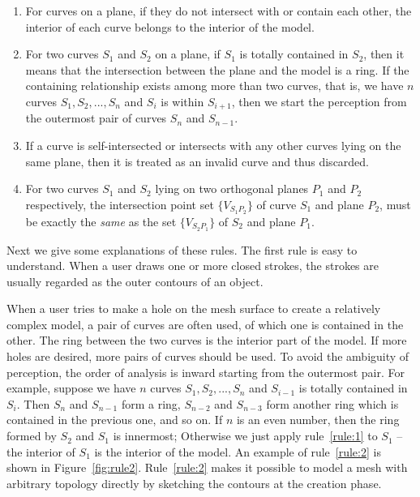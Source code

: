 \begin{enumerate}
    \item For curves on a plane, if they do not intersect with or contain each other, the interior of each curve belongs to the interior of the model.
    \label{rule:1}
    \item For two curves $S_1$ and $S_2$ on a plane, if $S_1$ is totally contained in $S_2$, then it means that the intersection between the plane and the model is a ring. If the containing relationship exists among more than two curves, that is, we have $n$ curves $S_1,S_2,...,S_n$ and $S_i$ is within $S_{i+1}$, then we start the perception from the outermost pair of curves $S_n$ and $S_{n-1}$.
    \label{rule:2}
    \item If a curve is self-intersected or intersects with any other curves lying on the same plane, then it is treated as an invalid curve and thus discarded.
    \label{rule:3}
    \item For two curves $S_1$ and $S_2$ lying on two orthogonal planes $P_1$ and $P_2$ respectively, the intersection point set $\{V_{S_1P_2}\}$ of curve $S_1$ and plane $P_2$, must be exactly the \emph{same} as the set $\{V_{S_2P_1}\}$ of $S_2$ and plane $P_1$.
    \label{rule:4}
\end{enumerate}

Next we give some explanations of these rules.  The first rule is
easy to understand. When a user draws one or more closed strokes,
the strokes are usually regarded as the outer contours of an object.

When a user tries to make a hole on the mesh surface  to create a
relatively complex model, a pair of curves are often used, of which
one is contained in the other. The ring between the two curves is
the interior part of the model. If more holes are desired, more
pairs of curves should be used. To avoid the ambiguity of
perception, the order of analysis is inward starting from the
outermost pair. For example, suppose we have $n$ curves
$S_1,S_2,...,S_n$ and $S_{i-1}$ is totally contained in  $S_i$. Then
$S_n$ and $S_{n-1}$ form a ring, $S_{n-2}$ and $S_{n-3}$ form
another ring which is contained in the previous one, and so on. If
$n$ is an even number, then the ring formed by $S_2$ and $S_1$ is
innermost; Otherwise we just apply rule~\ref{rule:1} to $S_1$ -- the
interior of $S_1$ is the interior of the model. An example of
rule~\ref{rule:2} is shown in Figure~\ref{fig:rule2}.
Rule~\ref{rule:2} makes it possible to model a mesh with arbitrary
topology directly by sketching the contours at the creation phase.

